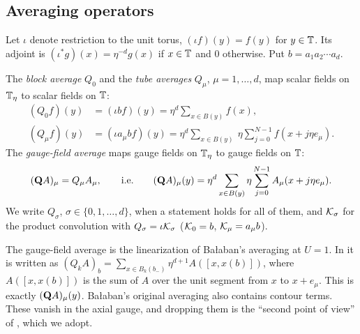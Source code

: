 \subsection{Averaging operators}

Let $\iota$ denote restriction to the unit torus, $(\iota f)(y)=f(y)$ for $y\in\mathbb T$. Its adjoint is $(\iota^*g)(x)=\eta^{-d}g(x)$ if $x\in\mathbb T$ and $0$ otherwise. Put $b=a_1a_2\cdots a_d$.

\begin{definition}\label{def:averages}
The \emph{block average} $Q_0$ and the \emph{tube averages} $Q_\mu$, $\mu=1,\dots,d$, map scalar fields on $\mathbb T_\eta$ to scalar fields on $\mathbb T$:
\begin{align*}
(Q_0f)(y)&=(\iota bf)(y)=\eta^d\sum_{x\in B(y)}f(x),\\
(Q_\mu f)(y)&=(\iota a_\mu bf)(y)=\eta^d\sum_{x\in B(y)}\ \eta\sum_{j=0}^{N-1}f(x+j\eta e_\mu).
\end{align*}
The \emph{gauge-field average} maps gauge fields on $\mathbb T_\eta$ to gauge fields on $\mathbb T$:
\[
(\mathbf Q A)_\mu=Q_\mu A_\mu,\qquad\text{i.e.}\qquad (\mathbf Q A)_\mu(y)=\eta^d\sum_{x\in B(y)}\eta\sum_{j=0}^{N-1}A_\mu(x+j\eta e_\mu).
\]
We write $Q_\sigma$, $\sigma\in\{0,1,\dots,d\}$, when a statement holds for all of them, and $\mathcal K_\sigma$ for the product convolution with $Q_\sigma=\iota\mathcal K_\sigma$ ($\mathcal K_0=b$, $\mathcal K_\mu=a_\mu b$).
\end{definition}

The gauge-field average is the linearization of Ba\l aban's averaging at $U=1$. In \cite[(1.11), (1.18)]{BalPropI} it is written as $(Q_kA)_b=\sum_{x\in B_k(b_-)}\eta^{d+1}A([x,x(b)])$, where $A([x,x(b)])$ is the sum of $A$ over the unit segment from $x$ to $x+e_\mu$. This is exactly $(\mathbf Q A)_\mu(y)$. Ba\l aban's original averaging \cite[(1.8)]{BalPropI} also contains contour terms. These vanish in the axial gauge, and dropping them is the ``second point of view'' of \cite[(1.13)]{BalPropI}, which we adopt.

